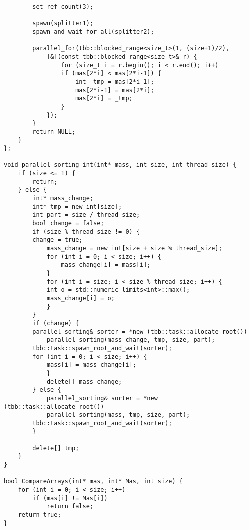 \documentclass{report}
\begin{document}
\begin{lstlisting}
        set_ref_count(3);

        spawn(splitter1);
        spawn_and_wait_for_all(splitter2);

        parallel_for(tbb::blocked_range<size_t>(1, (size+1)/2),
            [&](const tbb::blocked_range<size_t>& r) {
                for (size_t i = r.begin(); i < r.end(); i++)
                if (mas[2*i] < mas[2*i-1]) {
                    int _tmp = mas[2*i-1];
                    mas[2*i-1] = mas[2*i];
                    mas[2*i] = _tmp;
                }
            });
        }
        return NULL;
    }
};

void parallel_sorting_int(int* mass, int size, int thread_size) {
    if (size <= 1) {
        return;
    } else {
        int* mass_change;
        int* tmp = new int[size];
        int part = size / thread_size;
        bool change = false;
        if (size % thread_size != 0) {
        change = true;
            mass_change = new int[size + size % thread_size];
            for (int i = 0; i < size; i++) {
                mass_change[i] = mass[i];
            }
            for (int i = size; i < size % thread_size; i++) {
            int o = std::numeric_limits<int>::max();
            mass_change[i] = o;
            }
        }
        if (change) {
        parallel_sorting& sorter = *new (tbb::task::allocate_root())
            parallel_sorting(mass_change, tmp, size, part);
        tbb::task::spawn_root_and_wait(sorter);
        for (int i = 0; i < size; i++) {
            mass[i] = mass_change[i];
            }
            delete[] mass_change;
        } else {
            parallel_sorting& sorter = *new (tbb::task::allocate_root())
            parallel_sorting(mass, tmp, size, part);
        tbb::task::spawn_root_and_wait(sorter);
        }

        delete[] tmp;
    }
}

bool CompareArrays(int* mas, int* Mas, int size) {
    for (int i = 0; i < size; i++)
        if (mas[i] != Mas[i])
            return false;
    return true;
}

\end{lstlisting}
\end{document}
